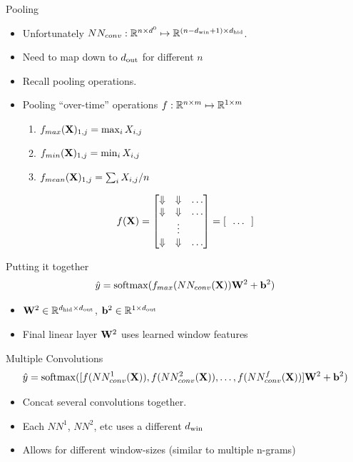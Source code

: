 \documentclass{beamer}
\begin{document}
\begin{frame}{Pooling}
  \begin{itemize}
  \item Unfortunately $NN_{conv}: \mathbb{R}^{n\times d^0 } \mapsto
    \mathbb{R}^{(n - {d_{\mathrm{win}}} + 1) \times {d_{\mathrm{hid}}}}$.
    \air 

  \item Need to map down to ${d_{\mathrm{out}}}$ for different $n$
    \air 

  \item Recall pooling operations. 
    \air 

  \item Pooling ``over-time'' operations $f: \mathbb{R}^{n\times m} \mapsto \mathbb{R}^{1 \times m}  $ 


  \begin{enumerate}
  \item $ f_{max}(\mathbf{X})_{1, j} = \max_{i} X_{i, j} $
  \item $ f_{min}(\mathbf{X})_{1, j} = \min_{i} X_{i, j} $
  \item $ f_{mean}(\mathbf{X})_{1, j} = \sum_i X_{i,j} / n $
  \end{enumerate}

  \end{itemize}

  \[f(\mathbf{X}) =  \begin{bmatrix}\Downarrow & \Downarrow  & \ldots \\   
    \Downarrow & \Downarrow & \ldots\\
    & \vdots \\ 
    \Downarrow &\Downarrow & \ldots \\
  \end{bmatrix} = [ \ \ \ldots \ \ ]  \]

  
\end{frame}

\begin{frame}{Putting it together}
  \[ \hat{y} = \softmax( f_{max}(NN_{conv}(\boldX)) \boldW^2 + \boldb^2 ) \]
  \begin{itemize}
  \item $\mathbf{W}^2 \in \mathbb{R}^{{d_{\mathrm{hid}}} \times {d_{\mathrm{out}}}}$, $\mathbf{b}^2 \in \mathbb{R}^{1 \times {d_{\mathrm{out}}}}$
    \air 
  \item Final linear layer $\mathbf{W}^2$ uses learned window features
  \end{itemize}
\end{frame}

\begin{frame}{Multiple Convolutions}
  \[ \hat{y} = \softmax([ f(NN^1_{conv}(\boldX)), f(NN^2_{conv}(\boldX)), \ldots, f(NN^f_{conv}(\boldX)) ]  \boldW^2 + \boldb^2 ) \]
  \begin{itemize}
  \item Concat several convolutions together. 
    \air 
  \item Each $NN^1$, $NN^2$, etc uses a different ${d_{\mathrm{win}}}$  
    \air
  \item Allows for different window-sizes (similar to multiple n-grams) 
  \end{itemize}
\end{frame}
\end{document}
